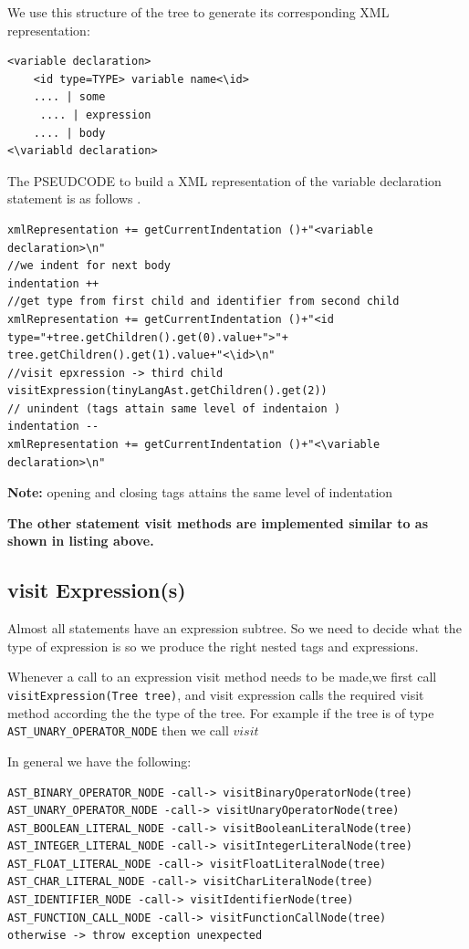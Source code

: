 We use this structure of the tree to generate its corresponding XML representation:
\begin{lstlisting}[caption=XML of variable declaration statement subtree]
<variable declaration>
    <id type=TYPE> variable name<\id>
    .... | some
     .... | expression
    .... | body
<\variabld declaration>
\end{lstlisting}




The PSEUDCODE  to build a XML representation of the variable declaration statement is as follows .
\begin{lstlisting}[caption=PSEUDCODE of \emph{visitVariableDeclarationNode(Tree tree)}]
xmlRepresentation += getCurrentIndentation ()+"<variable declaration>\n"
//we indent for next body 
indentation ++
//get type from first child and identifier from second child
xmlRepresentation += getCurrentIndentation ()+"<id type="+tree.getChildren().get(0).value+">"+ tree.getChildren().get(1).value+"<\id>\n"
//visit epxression -> third child 
visitExpression(tinyLangAst.getChildren().get(2))
// unindent (tags attain same level of indentaion )
indentation --
xmlRepresentation += getCurrentIndentation ()+"<\variable declaration>\n"
\end{lstlisting}


\textbf{Note:} opening and closing tags attains the same level of indentation

\textbf{
The other statement visit methods are implemented similar to as shown in listing above.
}

\subsection{visit Expression(s)}
\label{sec:visit expression visitor}
Almost all statements have an expression subtree. So we need to decide what the type of expression is so we produce the right nested tags and expressions.

Whenever a call to an expression visit method needs to be made,we first call \verb!visitExpression(Tree tree)!, and visit expression calls the required visit method according the the type of the tree. For example if the tree is of type \verb!AST_UNARY_OPERATOR_NODE! then we call $visit $ 

In general we have the following:
\begin{lstlisting}[caption=PSEUDOCODE for \emph{visitExpression(Tree tree)},label=listing:expression visit]
AST_BINARY_OPERATOR_NODE -call-> visitBinaryOperatorNode(tree)
AST_UNARY_OPERATOR_NODE -call-> visitUnaryOperatorNode(tree)
AST_BOOLEAN_LITERAL_NODE -call-> visitBooleanLiteralNode(tree)
AST_INTEGER_LITERAL_NODE -call-> visitIntegerLiteralNode(tree)
AST_FLOAT_LITERAL_NODE -call-> visitFloatLiteralNode(tree)
AST_CHAR_LITERAL_NODE -call-> visitCharLiteralNode(tree)
AST_IDENTIFIER_NODE -call-> visitIdentifierNode(tree)
AST_FUNCTION_CALL_NODE -call-> visitFunctionCallNode(tree)
otherwise -> throw exception unexpected
\end{lstlisting}

